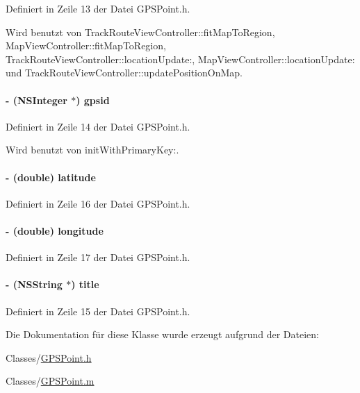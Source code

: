 Definiert in Zeile 13 der Datei GPSPoint.h.

Wird benutzt von TrackRouteViewController::fitMapToRegion, MapViewController::fitMapToRegion, TrackRouteViewController::locationUpdate:, MapViewController::locationUpdate: und TrackRouteViewController::updatePositionOnMap.\hypertarget{interface_g_p_s_point_a45b895e9be26a0d7c0ae84139b47f4be}{
\paragraph[{gpsid}]{\setlength{\rightskip}{0pt plus 5cm}-\/ (NSInteger $\ast$) gpsid}\hfill}
\label{interface_g_p_s_point_a45b895e9be26a0d7c0ae84139b47f4be}


Definiert in Zeile 14 der Datei GPSPoint.h.

Wird benutzt von initWithPrimaryKey:.\hypertarget{interface_g_p_s_point_aeb7b3c8169a9ed47bce47101b2419216}{
\paragraph[{latitude}]{\setlength{\rightskip}{0pt plus 5cm}-\/ (double) latitude}\hfill}
\label{interface_g_p_s_point_aeb7b3c8169a9ed47bce47101b2419216}


Definiert in Zeile 16 der Datei GPSPoint.h.\hypertarget{interface_g_p_s_point_a6ac49bdcdd308340aa71e5236a6ed51a}{
\paragraph[{longitude}]{\setlength{\rightskip}{0pt plus 5cm}-\/ (double) longitude}\hfill}
\label{interface_g_p_s_point_a6ac49bdcdd308340aa71e5236a6ed51a}


Definiert in Zeile 17 der Datei GPSPoint.h.\hypertarget{interface_g_p_s_point_a6695a368f34ece5bf6181cb49b5fd6b2}{
\paragraph[{title}]{\setlength{\rightskip}{0pt plus 5cm}-\/ (NSString $\ast$) title}\hfill}
\label{interface_g_p_s_point_a6695a368f34ece5bf6181cb49b5fd6b2}


Definiert in Zeile 15 der Datei GPSPoint.h.

Die Dokumentation für diese Klasse wurde erzeugt aufgrund der Dateien:\begin{DoxyCompactItemize}
\item 
Classes/\hyperlink{_g_p_s_point_8h}{GPSPoint.h}\item 
Classes/\hyperlink{_g_p_s_point_8m}{GPSPoint.m}\end{DoxyCompactItemize}
